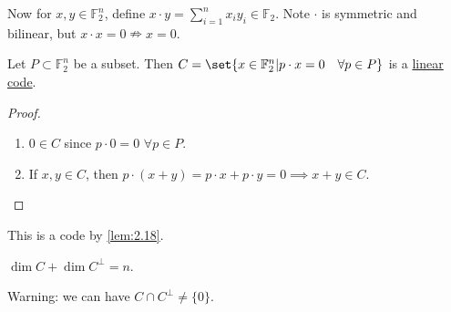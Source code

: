 \documentclass{article}
\newcommand{\F}{\mathbb{F}}
\newcommand{\1}[1]{\mathbbm{1}_{#1}}
\begin{document}
Now for $x, y \in \F_2^n$, define $x \cdot y = \sum_{i=1}^n x_i y_i \in \F_2$.
Note $\cdot$ is symmetric and bilinear, but $x \cdot x = 0 \nRightarrow x = 0$.
\begin{nlemma}\label{lem:2.18}
    Let $P \subset \mathbb{F}_2^n$ be a subset.
    Then $C = \set{x \in \mathbb{F}_2^n | p \cdot x = 0 \quad \forall p \in P}$ is a \hyperlink{def:linearCode}{linear code}.
\end{nlemma}
\begin{proof}
    \leavevmode
    \begin{enumerate}[label=(\roman*)]
        \item $0 \in C$ since $p \cdot 0 = 0$ $\forall p \in P$.
        \item If $x, y \in C$, then $p \cdot (x+y) = p \cdot x + p \cdot y = 0 \implies x + y \in C$. \qedhere
    \end{enumerate}
\end{proof}
This is a code by \cref{lem:2.18}.
\begin{nlemma}\label{lem:2.19}
    $\dim C + \dim C^\perp = n$.
\end{nlemma}
Warning: we can have $C \cap C^\perp \neq \{0\}$.
\end{document}
